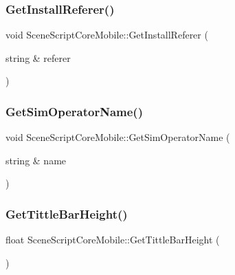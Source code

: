 \hypertarget{class_scene_script_core_mobile_a2cf129468a46d881c92acdb357cbf662}{}\label{class_scene_script_core_mobile_a2cf129468a46d881c92acdb357cbf662} 
\subsubsection{\texorpdfstring{Get\+Install\+Referer()}{GetInstallReferer()}}
{\footnotesize\ttfamily void Scene\+Script\+Core\+Mobile\+::\+Get\+Install\+Referer (\begin{DoxyParamCaption}\item[{string \&}]{referer }\end{DoxyParamCaption})}

\hypertarget{class_scene_script_core_mobile_af43ee93a60350979461600a320ed266d}{}\label{class_scene_script_core_mobile_af43ee93a60350979461600a320ed266d} 
\subsubsection{\texorpdfstring{Get\+Sim\+Operator\+Name()}{GetSimOperatorName()}}
{\footnotesize\ttfamily void Scene\+Script\+Core\+Mobile\+::\+Get\+Sim\+Operator\+Name (\begin{DoxyParamCaption}\item[{string \&}]{name }\end{DoxyParamCaption})}

\hypertarget{class_scene_script_core_mobile_ad09ce5f5f84f1df405c6dd22182abfb9}{}\label{class_scene_script_core_mobile_ad09ce5f5f84f1df405c6dd22182abfb9} 
\subsubsection{\texorpdfstring{Get\+Tittle\+Bar\+Height()}{GetTittleBarHeight()}}
{\footnotesize\ttfamily float Scene\+Script\+Core\+Mobile\+::\+Get\+Tittle\+Bar\+Height (\begin{DoxyParamCaption}{ }\end{DoxyParamCaption})}

